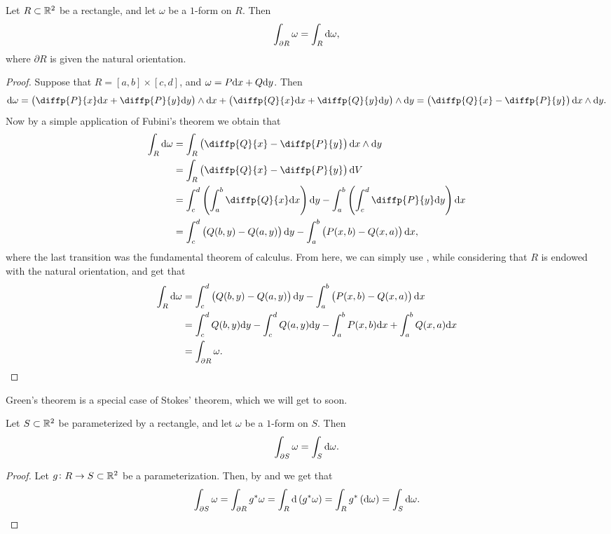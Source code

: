 \documentclass[11pt,a4paper]{article}
\begin{document}
\begin{theorem}
  \label{thm:green-for-rectangle}
  Let $R \subset \mathbb{R}^2$ be a rectangle,
  and let $\omega$ be a $1$-form on $R$.
  Then
  \[
    \int_{\partial R} \omega =
    \int_{R} \mathrm{d} \omega,
  \]
  where $\partial R$ is given the natural orientation.
\end{theorem}
\begin{proof}
  Suppose that $R = [a,b] \times [c,d]$,
  and $\omega = P \dx + Q \dy$.
  Then
  \[
    \dif \omega =
    \del{\diffp{P}{x} \dx + \diffp{P}{y} \dy} \wedge \dx +
    \del{\diffp{Q}{x} \dx + \diffp{Q}{y} \dy} \wedge \dy =
    \del{\diffp{Q}{x} - \diffp{P}{y}} \dx \wedge \dy.
  \]
  Now by a simple application of Fubini's theorem we obtain that
  \begin{align*}
    \int_{R} \dif \omega &=
    \int_{R} \del{\diffp{Q}{x} - \diffp{P}{y}} \dx \wedge \dy \\ &=
    \int_{R} \del{\diffp{Q}{x} - \diffp{P}{y}} \dV \\ &=
    \int_{c}^{d} \del{\int_{a}^{b} \diffp{Q}{x} \dx} \dy -
    \int_{a}^{b} \del{\int_{c}^{d} \diffp{P}{y} \dy} \dx \\ &=
    \int_{c}^{d} \del{Q(b,y) - Q(a,y)} \dy -
    \int_{a}^{b} \del{P(x,b) - Q(x,a)} \dx,
  \end{align*}
  where the last transition was the fundamental theorem of calculus.
  From here, we can simply use ,
  while considering that $R$ is endowed with the natural orientation,
  and get that
  \begin{align*}
    \int_{R} \dif \omega &=
    \int_{c}^{d} \del{Q(b,y) - Q(a,y)} \dy -
    \int_{a}^{b} \del{P(x,b) - Q(x,a)} \dx \\ &=
    \int_{c}^{d} Q(b,y) \dy - \int_{c}^{d} Q(a,y) \dy -
    \int_{a}^{b} P(x,b) \dx + \int_{a}^{b} Q(x,a) \dx \\ &=
    \int_{\partial R} \omega.
  \end{align*}
\end{proof}

\begin{remark}
  Green's theorem is a special case of Stokes' theorem,
  which we will get to soon.
\end{remark}

\begin{corollary}
  Let $S \subset \mathbb{R}^2$ be parameterized by a rectangle,
  and let $\omega$ be a $1$-form on $S$.
  Then
  \[
    \int_{\partial S} \omega =
    \int_{S} \mathrm{d} \omega.
  \]
\end{corollary}
\begin{proof}
  Let $g \colon R \to S \subset \mathbb{R}^2$ be a parameterization.
  Then, by 
  and  we get that
  \[
    \int_{\partial S} \omega =
    \int_{\partial R} g^*\omega =
    \int_{R} \dif\del{g^*\omega} =
    \int_{R} g^*\del{\dif \omega} =
    \int_{S} \dif \omega.
  \]
\end{proof}
\end{document}
